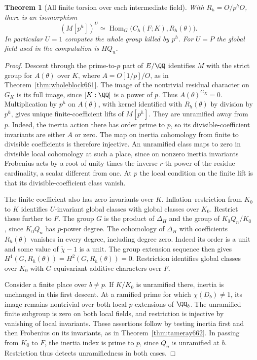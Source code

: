 \documentclass[a4paper,11pt]{article}
\newtheorem{theorem}[proposition]{Theorem}
\theoremstyle{definition}
\theoremstyle{remark}
\numberwithin{equation}{section}
\begin{document}
\begin{theorem}[All finite torsion over each intermediate field]
\leavevmode\label{thm:everycyclic663}
With \(R_h=O/p^hO\), there is an isomorphism
\[
       (M[p^h])^U \simeq
        \operatorname{Hom}_{G}\big(C_h(F;K),R_h(\theta)\big).
\]
In particular \(U=1\) computes the whole group killed by \(p^h\).
For \(U=P\) the global field used in the computation is \(H Q_n\).
\end{theorem}
\begin{proof}
Descent through the prime-to-\(p\) part of \(E/\QQ\) identifies
\(M\) with the strict group for \(A(\theta)\) over \(K\), where
\(A=O[1/p]/O\), as in Theorem~\ref{thm:wholeblock661}.
The image of the nontrivial residual character on \(G_K\) is
its full image, since \([K:\QQ]\) is a power of \(p\).
Thus \(A(\theta)^{G_K}=0\). Multiplication by \(p^h\) on
\(A(\theta)\), with kernel identified with \(R_h(\theta)\)
by division by \(p^h\), gives unique finite-coefficient lifts
of \(M[p^h]\). They are unramified away from \(p\). Indeed,
the inertia action there has order prime to \(p\), so its
divisible-coefficient invariants are either \(A\) or zero.
The map on inertia cohomology from finite to divisible
coefficients is therefore injective. An unramified class maps
to zero in divisible local cohomology at such a place, since
on nonzero inertia invariants Frobenius acts by a root of unity
times the inverse \(r\)-th power of the residue cardinality,
a scalar different from one. At \(p\) the local condition on
the finite lift is that its divisible-coefficient class vanish.

The finite coefficient also has zero invariants over \(K\).
Inflation--restriction from \(K_0\) to \(K\) identifies
\(U\)-invariant global classes with global classes over \(K_0\).
Restrict these further to \(F\). The group \(G\) is the product
of \(\Delta_H\) and the group of \(K_0 Q_n/K_0\), since
\(K_0 Q_n\) has \(p\)-power degree. The cohomology of
\(\Delta_H\) with coefficients \(R_h(\theta)\) vanishes in
every degree, including degree zero. Indeed its order is a unit
and some value of \(\widetilde\chi-1\) is a unit. The group
extension sequence then gives \(H^1(G,R_h(\theta))=
H^2(G,R_h(\theta))=0\). Restriction identifies global classes
over \(K_0\) with \(G\)-equivariant additive characters over
\(F\).

Consider a finite place over \(b\ne p\). If \(K/K_0\) is
unramified there, inertia is unchanged in this first descent.
At a ramified prime for which \(\chi(D_b)\ne1\), its image
remains nontrivial over both local \(p\)-extensions of
\(\QQ_b\). The unramified finite subgroup is zero on both
local fields, and restriction is injective by vanishing of
local invariants. These assertions follow by testing inertia
first and then Frobenius on its invariants, as in
Theorem~\ref{thm:tameray662}. In passing from \(K_0\) to \(F\),
the inertia index is prime to \(p\), since \(Q_n\) is unramified
at \(b\). Restriction thus detects unramifiedness in both cases.


\end{proof}
\end{document}
